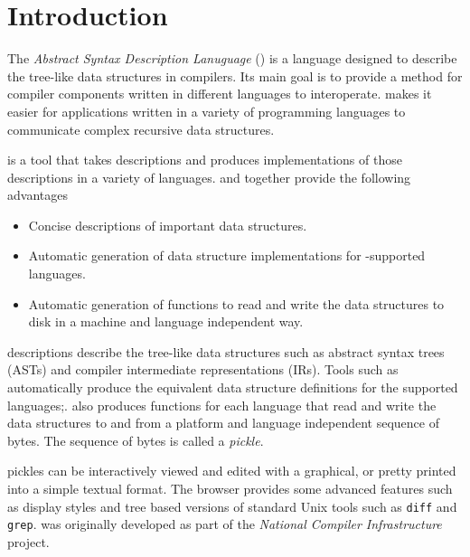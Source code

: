 %
\chapter{Introduction}
\label{chap:introduction}

\thispagestyle{empty}

The \emph{Abstract Syntax Description Lanuguage} (\asdl{}) is a language
designed to describe the tree-like data structures in compilers.
Its main goal is to provide a method for
compiler components written in different languages to
interoperate. \asdl{} makes it easier for applications written in a
variety of programming languages to communicate complex recursive data
structures. 

\asdlgen{} is a tool that takes \asdl{} descriptions and produces
implementations of those descriptions in a variety of languages.
\asdl{} and \asdlgen{} together provide the following advantages
\begin{itemize}
  \item Concise descriptions of important data structures.
  \item Automatic generation of data structure implementations for
    \asdlgen{}-supported languages.
  \item Automatic generation of functions to read and write the data
    structures to disk in a machine and language independent way.
\end{itemize}%

\asdl{} descriptions describe the tree-like data structures such as
abstract syntax trees (ASTs) and compiler intermediate representations
(IRs). Tools such as \asdlgen{} automatically produce the equivalent
data structure definitions for the supported languages;.
\asdlgen{} also produces functions for each language that read and
write the data structures to and from a platform and language
independent sequence of bytes. The sequence of bytes is called a
\emph{pickle}.

\asdl{} pickles can be interactively viewed and edited with a graphical,
or pretty printed into a simple textual format.
The browser provides some advanced features
such as display styles and tree based versions of standard Unix tools
such as \texttt{diff} and \texttt{grep}.
\asdl{} was originally developed as part of the
\emph{National Compiler Infrastructure} project.
